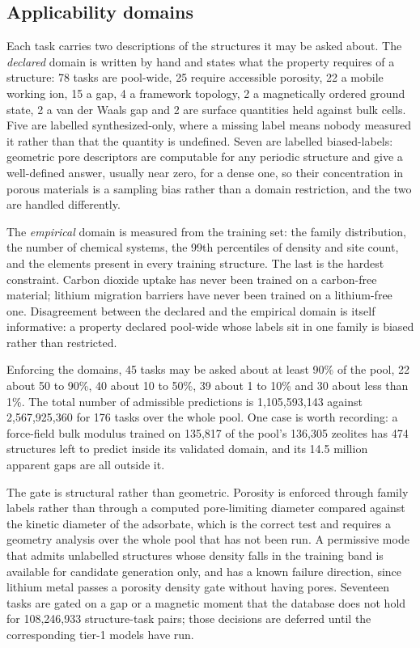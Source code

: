 \subsection{Applicability domains}

Each task carries two descriptions of the structures it may be asked about. The
\emph{declared} domain is written by hand and states what the property requires
of a structure: 78 tasks are pool-wide, 25 require accessible porosity, 22 a
mobile working ion, 15 a gap, 4 a framework topology, 2 a magnetically ordered
ground state, 2 a van der Waals gap and 2 are surface quantities held against
bulk cells. Five are labelled synthesized-only, where a missing label means
nobody measured it rather than that the quantity is undefined. Seven are labelled
biased-labels: geometric pore descriptors are computable for any periodic
structure and give a well-defined answer, usually near zero, for a dense one, so
their concentration in porous materials is a sampling bias rather than a domain
restriction, and the two are handled differently.

The \emph{empirical} domain is measured from the training set: the family
distribution, the number of chemical systems, the 99th percentiles of density and
site count, and the elements present in every training structure. The last is the
hardest constraint. Carbon dioxide uptake has never been trained on a
carbon-free material; lithium migration barriers have never been trained on a
lithium-free one. Disagreement between the declared and the empirical domain is
itself informative: a property declared pool-wide whose labels sit in one family
is biased rather than restricted.

Enforcing the domains, 45 tasks may be asked about at least 90\% of the pool, 22
about 50 to 90\%, 40 about 10 to 50\%, 39 about 1 to 10\% and 30 about less than
1\%. The total number of admissible predictions is 1{,}105{,}593{,}143 against
2{,}567{,}925{,}360 for 176 tasks over the whole pool. One case is worth
recording: a force-field bulk modulus trained on 135{,}817 of the pool's
136{,}305 zeolites has 474 structures left to predict inside its validated
domain, and its 14.5 million apparent gaps are all outside it.

The gate is structural rather than geometric. Porosity is enforced through family
labels rather than through a computed pore-limiting diameter compared against the
kinetic diameter of the adsorbate, which is the correct test and requires a
geometry analysis over the whole pool that has not been run. A permissive mode
that admits unlabelled structures whose density falls in the training band is
available for candidate generation only, and has a known failure direction, since
lithium metal passes a porosity density gate without having pores. Seventeen
tasks are gated on a gap or a magnetic moment that the database does not hold for
108{,}246{,}933 structure-task pairs; those decisions are deferred until the
corresponding tier-1 models have run.

